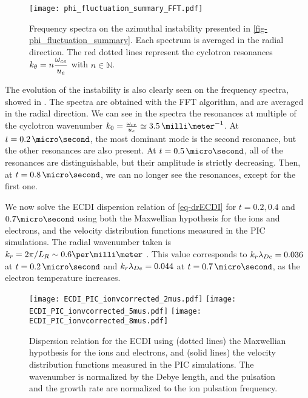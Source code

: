    \begin{figure}[!hbt]
      \centering
      \texttt{[image: phi\_fluctuation\_summary\_FFT.pdf]}
      \caption{Frequency spectra on the azimuthal instability presented in \cref{fig-phi_fluctuation_summary}. Each spectrum is averaged in the radial direction. The red dotted lines represent the cyclotron resonances $k_{\theta} = n \dfrac{\omega_{ce}}{u_e}$ with $n \in \mathbb{N}$.}
      \label{fig-phi_fluctuation_summary_FFT}
    \end{figure}
    
    The evolution of the instability is also clearly seen on the frequency spectra, showed in .
    The spectra are obtained with the FFT algorithm, and are averaged in the radial direction.
    We can see in the spectra the resonances at multiple of the cyclotron wavenumber $k_0 = \frac{\oce}{u_e} \simeq 3.5\,\milli\meter^{-1}$.
    At $t=0.2\,\micro\second$, the most dominant mode is the second resonance, but the other resonances are also present.
    At $t=0.5\,\micro\second$, all of the resonances are distinguishable, but their amplitude is strictly decreasing.
    Then, at $t=0.8\,\micro\second$, we can no longer see the resonances, except for the first one.
    
    \vspace{1em}
    We now solve the \ac{ECDI} dispersion relation of \cref{eq-drECDI} for $t=0.2, 0.4$ and $0.7\micro\second$ using both the Maxwellian hypothesis for the ions and electrons, and the velocity distribution functions measured in the \ac{PIC} simulations.
    The radial wavenumber taken is $k_r = 2 \pi/L_R \sim 0.6 \per\milli\meter$ \citep{lafleur2016,janhunen2018}.
    This value corresponds to $k_r \lambda_{De} = 0.036$ at $t=0.2\,\micro\second$ and $k_r \lambda_{De} = 0.044$ at $t=0.7\,\micro\second$, as the electron temperature increases.

    \begin{figure}[!hbt]
      \centering
        \texttt{[image: ECDI\_PIC\_ionvcorrected\_2mus.pdf]} 
        \texttt{[image: ECDI\_PIC\_ionvcorrected\_5mus.pdf]} 
        \texttt{[image: ECDI\_PIC\_ionvcorrected\_8mus.pdf]} 
      \caption{Dispersion relation for the \acs{ECDI} using (dotted lines) the Maxwellian hypothesis for the ions and electrons, and (solid lines) the velocity distribution functions measured in the \acs{PIC} simulations. The wavenumber is normalized by the Debye length, and the pulsation and the growth rate are normalized to the ion pulsation frequency.}
      \label{fig-DRECDI}
    \end{figure}
    
